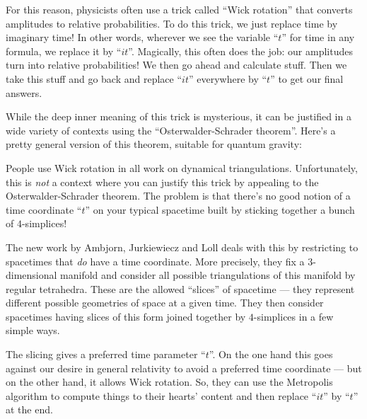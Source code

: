 \documentclass{article}
\def\tightlist{}
\renewcommand{\texttt}[1]{%
  \begingroup
  \ttfamily
  \begingroup\lccode`~=`/\lowercase{\endgroup\def~}{/\discretionary{}{}{}}%
  \begingroup\lccode`~=`[\lowercase{\endgroup\def~}{[\discretionary{}{}{}}%
  \begingroup\lccode`~=`.\lowercase{\endgroup\def~}{.\discretionary{}{}{}}%
  \catcode`/=\active\catcode`[=\active\catcode`.=\active
  \scantokens{#1\noexpand}%
  \endgroup
}
\begin{document}
For this reason, physicists often use a trick called ``Wick rotation''
that converts amplitudes to relative probabilities. To do this trick, we
just replace time by imaginary time! In other words, wherever we see the
variable ``\(t\)'' for time in any formula, we replace it by ``\(it\)''.
Magically, this often does the job: our amplitudes turn into relative
probabilities! We then go ahead and calculate stuff. Then we take this
stuff and go back and replace ``\(it\)'' everywhere by ``\(t\)'' to get
our final answers.

While the deep inner meaning of this trick is mysterious, it can be
justified in a wide variety of contexts using the ``Osterwalder-Schrader
theorem''. Here's a pretty general version of this theorem, suitable for
quantum gravity:


People use Wick rotation in all work on dynamical triangulations.
Unfortunately, this is \emph{not} a context where you can justify this
trick by appealing to the Osterwalder-Schrader theorem. The problem is
that there's no good notion of a time coordinate ``\(t\)'' on your
typical spacetime built by sticking together a bunch of \(4\)-simplices!

The new work by Ambjorn, Jurkiewiecz and Loll deals with this by
restricting to spacetimes that \emph{do} have a time coordinate. More
precisely, they fix a \(3\)-dimensional manifold and consider all
possible triangulations of this manifold by regular tetrahedra. These
are the allowed ``slices'' of spacetime --- they represent different
possible geometries of space at a given time. They then consider
spacetimes having slices of this form joined together by \(4\)-simplices
in a few simple ways.

The slicing gives a preferred time parameter ``\(t\)''. On the one hand
this goes against our desire in general relativity to avoid a preferred
time coordinate --- but on the other hand, it allows Wick rotation. So,
they can use the Metropolis algorithm to compute things to their hearts'
content and then replace ``\(it\)'' by ``\(t\)'' at the end.
\end{document}
